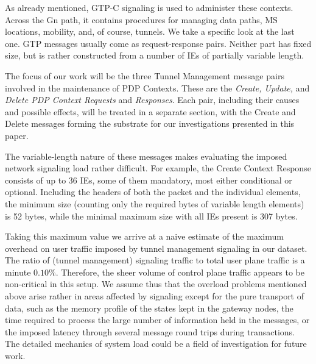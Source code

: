 As already mentioned, GTP-C signaling is used to administer these contexts. Across the Gn path, it contains procedures for managing data paths, \ac{MS} locations, mobility, and, of course, tunnels. We take a specific look at the last one. \ac{GTP} messages usually come as request-response pairs. Neither part has fixed size, but is rather constructed from a number of \acp{IE} of partially variable length. 

The focus of our work will be the three Tunnel Management message pairs involved in the maintenance of PDP Contexts. These are the \textit{Create, Update,} and \textit{Delete PDP Context Requests} and \textit{Responses}. Each pair, including their causes and possible effects, will be treated in a separate section, with the Create and Delete messages forming the substrate for our investigations presented in this paper.

The variable-length nature of these messages makes evaluating the imposed network signaling load rather difficult. For example, the Create Context Response consists of up to 36 \acp{IE}, some of them mandatory, most either conditional or optional. Including the headers of both the packet and the individual elements, the minimum size (counting only the required bytes of variable length elements) is 52 bytes, while the minimal maximum size with all \acp{IE} present is 307 bytes.

Taking this maximum value we arrive at a naive estimate of the maximum overhead on user traffic imposed by tunnel management signaling in our dataset. The ratio of (tunnel management) signaling traffic to total user plane traffic is a minute $0.10\%$. Therefore, the sheer volume of control plane traffic appears to be non-critical in this setup. We assume thus that the overload problems mentioned above arise rather in areas affected by signaling except for the pure transport of data, such as the memory profile of the states kept in the gateway nodes, the time required to process the large number of information held in the messages, or the imposed latency through several message round trips during transactions. The detailed mechanics of system load could be a field of investigation for future work.









